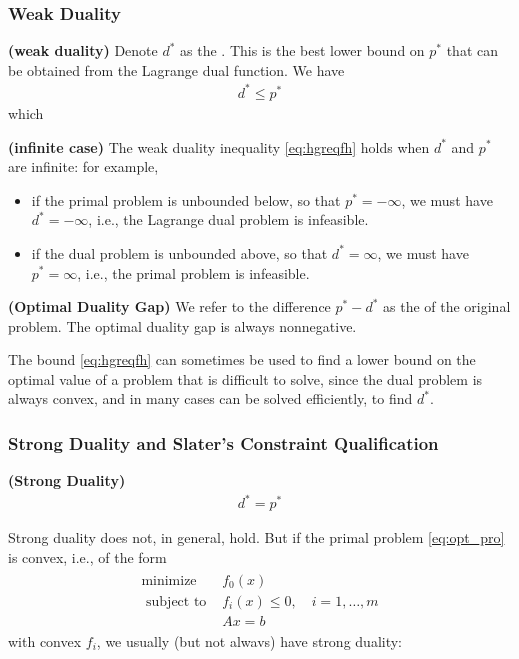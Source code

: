 \documentclass{article}
\newcommand{\bfs}[1]{\textbf{({#1}) }}
\begin{document}
\subsubsection{Weak Duality}
\begin{lema}\bfs{weak duality}
 Denote  $d^* $ as the . This is the best lower bound on $p^* $ that can be obtained from the Lagrange dual function. We have
\begin{align}
d^*  \leq p^* \label{eq:hgreqfh}
\end{align}
which 
\end{lema}
\begin{rema}\bfs{infinite case}
The weak duality inequality \cref{eq:hgreqfh} holds when $d^* $ and $p^* $ are infinite: for example,
\begin{itemize}
    \item if the primal problem is unbounded below, so that $p^* =-\infty$, we must have $d^* =-\infty$, i.e., the Lagrange dual problem is infeasible.
    \item  if the dual problem is unbounded above, so that $d^* =\infty$, we must have $p^* =\infty$, i.e., the primal problem is infeasible.
\end{itemize}
\end{rema}
\begin{defa}\bfs{Optimal Duality Gap}\label{def:odg}
We refer to the difference $p^* -d^* $ as the  of the original problem. The optimal duality gap is always nonnegative.
\end{defa}
\begin{rema}
The bound \cref{eq:hgreqfh} can sometimes be used to find a lower bound on the optimal value of a problem that is difficult to solve, since the dual problem is always convex, and in many cases can be solved efficiently, to find $d^* $.
\end{rema} 
\subsubsection{Strong Duality and Slater's Constraint Qualification}
\begin{defa}\bfs{Strong Duality}
\begin{align*}
d^* =p^* 
\end{align*}
\end{defa}

Strong duality does not, in general, hold. But if the primal problem \cref{eq:opt_pro} is 
convex, i.e., of the form
\begin{align}
\begin{array}{ll}
\operatorname{minimize} & f_{0}(x) \\
\text { subject to } & f_{i}(x) \leq 0, \quad i=1, \ldots, m \\
& A x=b
\end{array}\label{eq:opt_convex}
\end{align}
with convex $f_i$, we usually (but not alwavs) have strong duality: 
\end{document}
